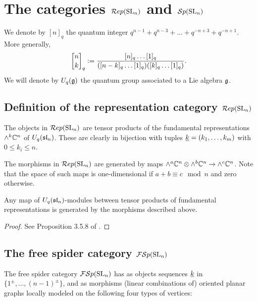 \documentclass[10pt,leqno]{article}
\begin{document}
\section{The categories $\Rep(\SL_n)$ and $\Sp(\SL_n)$}\label{sec:diagrams}

We denote by $[n]_q$ the quantum integer $q^{n-1} + q^{n-3} + \dots + q^{-n+3} + q^{-n+1}$. More generally, 
$$\qBinomial{n}{k} := \frac{[n]_q\dots[1]_q}{([n-k]_q \dots [1]_q)([k]_q \dots [1]_q)}.$$
We will denote by $U_q(\g)$ the quantum group associated to a Lie algebra $\g$. 

\subsection{Definition of the representation category $\Rep(\SL_n)$}

The objects in $\Rep(\SL_n)$ are tensor products of the fundamental representations $\alt^k \bC^n$ of $U_q(\sl_n)$. These are clearly in bijection with tuples $\ul{k} = (k_1, \dots, k_m)$ with $0 \le k_i \le n$. 

The morphisms in $\Rep(\SL_n)$ are generated by maps $\alt^a \bC^n \otimes \alt^b \bC^n \rightarrow \alt^c \bC^n$. Note that the space of such maps is one-dimensional if $a+b \equiv c \mod n$ and zero otherwise. 

\begin{lem}\label{lem:surjective} Any map of $U_q(\sl_n)$-modules between tensor products of fundamental representations is generated by the morphisms described above.
\end{lem}
\begin{proof}
See Proposition 3.5.8 of \cite{0704.1503}.
\end{proof}

\subsection{The free spider category $\FSp(\SL_n)$} 
The free spider category $\FSp(\SL_n)$ has as objects sequences $\ul{k}$ in $\{1^\pm,\ldots,(n-1)^\pm\}$, and as morphisms (linear combinations of) oriented planar graphs locally modeled on the following four types of vertices:
\newcommand{\fuse}[3]{\tikz[baseline=0.5cm]{
\coordinate (z1) at (0,0);
\coordinate (z2) at (1,0);
\coordinate (c) at (0.5,0.5);
\coordinate (e) at (0.5,1);
\draw[mid>] (z1) node[below] {$#1$} -- (c);
\draw[mid>] (z2) node[below] {$#2$} -- (c);
\draw[mid>] (c) -- (e) node[above] {$#3$};
}}
\newcommand{\fork}[3]{\tikz[baseline=0.5cm]{
\coordinate (z1) at (0,1);
\coordinate (z2) at (1,1);
\coordinate (c) at (0.5,0.5);
\coordinate (e) at (0.5,0);
\draw[mid<] (z1) node[above] {$#1$} -- (c);
\draw[mid<] (z2) node[above] {$#2$} -- (c);
\draw[mid<] (c) -- (e) node[below] {$#3$};
}}
\end{document}
